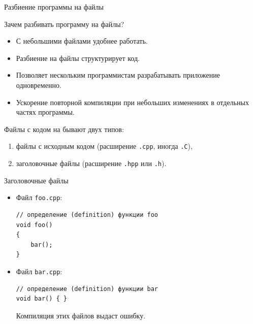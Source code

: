 \documentclass[aspectration=1610,t]{beamer}
\begin{document}
\begin{frame}[fragile]{Разбиение программы на файлы}

Зачем разбивать программу на файлы? 
\begin{itemize}
    \item С небольшими файлами удобнее работать.
    \item Разбиение на файлы структурирует код.
    \item Позволяет нескольким программистам разрабатывать 
        приложение одновременно.
    \item Ускорение повторной компиляции при небольших 
        изменениях в отдельных частях программы. 
        
\end{itemize}
    Файлы с кодом на \langcpp бывают двух типов:
    \begin{enumerate}
        \item файлы с исходным кодом (расширение \texttt{.cpp}, иногда \texttt{.C}),
        \item заголовочные файлы (расширение \texttt{.hpp} или \texttt{.h}).
    \end{enumerate}
\end{frame}

%

\begin{frame}[fragile]{Заголовочные файлы}
\begin{itemize}
    \item Файл {\tt foo.cpp}:
{\small \begin{lstlisting}
// определение (definition) функции foo
void foo()
{
    bar();
}
\end{lstlisting}}

\item Файл {\tt bar.cpp}:
\begin{lstlisting}
// определение (definition) функции bar
void bar() { }
\end{lstlisting}

Компиляция этих файлов выдаст ошибку.
\end{itemize}
\end{frame}
\end{document}
